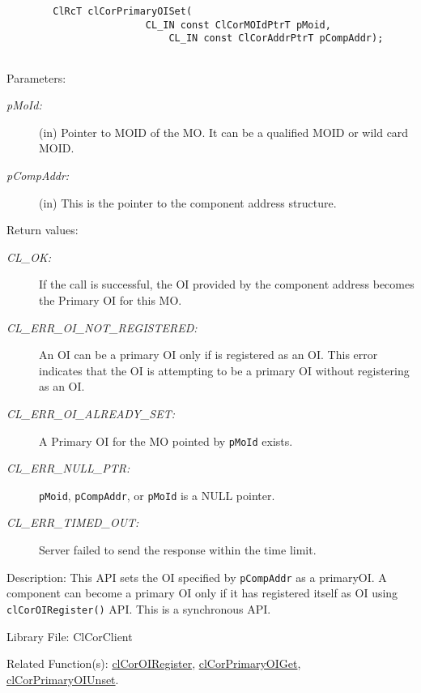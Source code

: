 \begin{flushleft}
\begin{Desc}
\footnotesize\begin{verbatim}        ClRcT clCorPrimaryOISet(
						CL_IN const ClCorMOIdPtrT pMoid,
    						CL_IN const ClCorAddrPtrT pCompAddr);


\end{verbatim}
\normalsize
\end{Desc}
\begin{Desc}
\item[Parameters:]
\begin{description}
\item[{\em p\-MoId:}](in) Pointer to MOID of the MO. It can be a qualified MOID or wild card MOID.
\item[{\em p\-Comp\-Addr:}](in) This is the pointer to the component address structure.

\end{description}
\end{Desc}
\begin{Desc}
\item[Return values:]
\begin{description}

\item[{\em CL\_\-OK:}] If the call is successful, the OI provided by the component address becomes the Primary OI for this MO.
 \item[{\em CL\_\-ERR\_\-OI\_\-NOT\_\-REGISTERED:}] An OI can be a primary OI only if is registered as an OI. This error indicates that the OI 
 is attempting to be a primary OI without registering as an OI.
 \item[{\em CL\_\-ERR\_\-OI\_\-ALREADY\_\-SET:}] A Primary OI for the MO pointed by {\tt{pMoId}} exists.
 \item[{\em CL\_\-ERR\_\-NULL\_\-PTR:}]  {\tt{pMoid}}, {\tt{pCompAddr}}, or {\tt{pMoId}} is a NULL pointer.
\item[{\em CL\_\-ERR\_\-TIMED\_\-OUT:}] Server failed to send the response within the time limit. 
 
 \end{description}
\end{Desc}
\begin{Desc}
\item[Description:]
This API sets the OI specified by {\tt{pCompAddr}} as a primaryOI. 
A component can become a primary OI only if it has registered itself as OI using {\tt{clCorOIRegister()}} API.
This is a synchronous API.
\end{Desc}
\begin{Desc}
\item[Library File:]Cl\-Cor\-Client\end{Desc}
\begin{Desc}
\item[Related Function(s):]\hyperlink{pagecor135}{clCorOIRegister}, \hyperlink{pagecor138}{clCorPrimaryOIGet},
\hyperlink{pagecor139}{clCorPrimaryOIUnset}.
\end{Desc}
\newpage




\end{flushleft}

